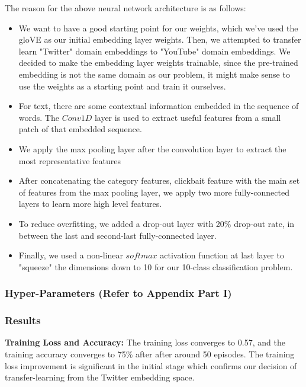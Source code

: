 \documentclass[english]{article}
\begin{document}
\begin{enumerate}
    
    The reason for the above neural network architecture is as follows:
    \begin{itemize}
        \item We want to have a good starting point for our weights, which we've used the gloVE as our initial embedding layer weights. Then, we attempted to transfer learn "Twitter" domain embeddings to "YouTube" domain embeddings. We decided to make the embedding layer weights trainable, since the pre-trained embedding is not the same domain as our problem, it might make sense to use the weights as a starting point and train it ourselves.
        \item For text, there are some contextual information embedded in the sequence of words. The $Conv1D$ layer is used to extract useful features from a small patch of that embedded sequence.
        \item We apply the max pooling layer after the convolution layer to extract the most representative features
        \item After concatenating the category features, clickbait feature with the main set of features from the max pooling layer, we apply two more fully-connected layers to learn more high level features.
        \item To reduce overfitting, we added a drop-out layer with 20\% drop-out rate, in between the last and second-last fully-connected layer.
        \item Finally, we used a non-linear $softmax$ activation function at last layer to "squeeze" the dimensions down to 10 for our 10-class classification problem.
    \end{itemize}

\end{enumerate}
\subsubsection{Hyper-Parameters (Refer to Appendix Part I)}

\subsubsection{Results}
\textbf{Training Loss and Accuracy:} The training loss converges to 0.57, and the training accuracy converges to 75\% after after around 50 episodes. The training loss improvement is significant in the initial stage which confirms our decision of transfer-learning from the Twitter embedding space.\\
\end{document}
